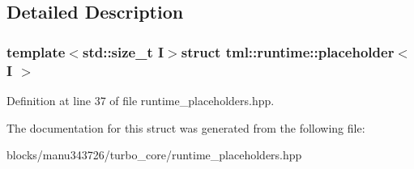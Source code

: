 \subsection{Detailed Description}
\subsubsection*{template$<$std\+::size\+\_\+t I$>$struct tml\+::runtime\+::placeholder$<$ I $>$}



Definition at line 37 of file runtime\+\_\+placeholders.\+hpp.



The documentation for this struct was generated from the following file\+:\begin{DoxyCompactItemize}
\item 
blocks/manu343726/turbo\+\_\+core/runtime\+\_\+placeholders.\+hpp\end{DoxyCompactItemize}
